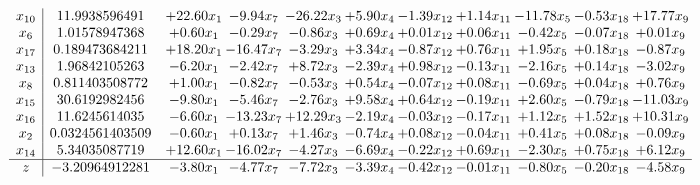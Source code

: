 \documentclass[9pt]{article}
\begin{document}
\[\begin{array}{c| c c@{\hskip 2pt} c@{\hskip 2pt} c@{\hskip 2pt} c@{\hskip 2pt} c@{\hskip 2pt} c@{\hskip 2pt} c@{\hskip 2pt} c@{\hskip 2pt} c@{\hskip 2pt} }
 x_{10}   &  11.9938596491 & + 22.60 x_{1} & -9.94 x_{7} & -26.22 x_{3} & +  5.90 x_{4} & -1.39 x_{12} & +  1.14 x_{11} & -11.78 x_{5} & -0.53 x_{18} & + 17.77 x_{9}\\
 x_{6}   &  1.01578947368 & +  0.60 x_{1} & -0.29 x_{7} & -0.86 x_{3} & +  0.69 x_{4} & +  0.01 x_{12} & +  0.06 x_{11} & -0.42 x_{5} & -0.07 x_{18} & +  0.01 x_{9}\\
 x_{17}   &  0.189473684211 & + 18.20 x_{1} & -16.47 x_{7} & -3.29 x_{3} & +  3.34 x_{4} & -0.87 x_{12} & +  0.76 x_{11} & +  1.95 x_{5} & +  0.18 x_{18} & -0.87 x_{9}\\
 x_{13}   &  1.96842105263 & -6.20 x_{1} & -2.42 x_{7} & +  8.72 x_{3} & -2.39 x_{4} & +  0.98 x_{12} & -0.13 x_{11} & -2.16 x_{5} & +  0.14 x_{18} & -3.02 x_{9}\\
 x_{8}   &  0.811403508772 & +  1.00 x_{1} & -0.82 x_{7} & -0.53 x_{3} & +  0.54 x_{4} & -0.07 x_{12} & +  0.08 x_{11} & -0.69 x_{5} & +  0.04 x_{18} & +  0.76 x_{9}\\
 x_{15}   &  30.6192982456 & -9.80 x_{1} & -5.46 x_{7} & -2.76 x_{3} & +  9.58 x_{4} & +  0.64 x_{12} & -0.19 x_{11} & +  2.60 x_{5} & -0.79 x_{18} & -11.03 x_{9}\\
 x_{16}   &  11.6245614035 & -6.60 x_{1} & -13.23 x_{7} & + 12.29 x_{3} & -2.19 x_{4} & -0.03 x_{12} & -0.17 x_{11} & +  1.12 x_{5} & +  1.52 x_{18} & + 10.31 x_{9}\\
 x_{2}   &  0.0324561403509 & -0.60 x_{1} & +  0.13 x_{7} & +  1.46 x_{3} & -0.74 x_{4} & +  0.08 x_{12} & -0.04 x_{11} & +  0.41 x_{5} & +  0.08 x_{18} & -0.09 x_{9}\\
 x_{14}   &  5.34035087719 & + 12.60 x_{1} & -16.02 x_{7} & -4.27 x_{3} & -6.69 x_{4} & -0.22 x_{12} & +  0.69 x_{11} & -2.30 x_{5} & +  0.75 x_{18} & +  6.12 x_{9}\\
\hline
z    &  -3.20964912281 & -3.80 x_{1} & -4.77 x_{7} & -7.72 x_{3} & -3.39 x_{4} & -0.42 x_{12} & -0.01 x_{11} & -0.80 x_{5} & -0.20 x_{18} & -4.58 x_{9}\\
\end{array}\]
\end{document}
